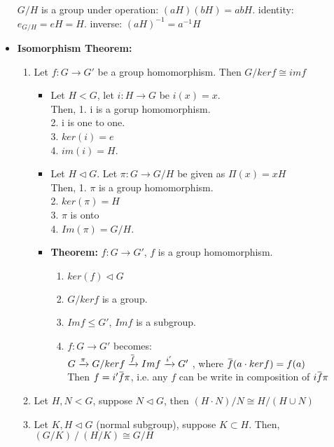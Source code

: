 \documentclass[12pt]{article}
\newcommand{\overbar}[1]{\mkern 1.5mu\overline{\mkern-1.5mu#1\mkern-1.5mu}\mkern 1.5mu}
\begin{document}
\begin{itemize}
    $G/H$ is a group under operation: $(aH)(bH) = abH$. identity: $e_{G/H} = eH = H$. inverse: $(aH)^{-1} = a^{-1}H$
    \item \textbf{Isomorphism Theorem:}
    \begin{enumerate}
        \item Let $f: G \rightarrow G'$ be a group homomorphism. Then $G/kerf \cong imf$
        \begin{itemize}
            \item Let $H < G$, let $i: H \rightarrow G$ be $i(x) = x$.\\
            Then, 1. i is a gorup homomorphism.\\
            2. i is one to one.\\
            3. $ker(i) = e$\\
            4. $im(i) = H$.
            \item Let $H \triangleleft G$. Let $\pi: G \rightarrow G/H$ be given as $\Pi(x) = xH$\\
            Then, 1. $\pi$ is a group homomorphism.\\
            2. $ker(\pi) = H$\\
            3. $\pi$ is onto \\
            4. $Im(\pi) = G/H$.
            \item \textbf{Theorem:} $f: G \rightarrow G'$, $f$ is a group homomorphism.
            \begin{enumerate}
                \item $ker(f) \triangleleft G$
                \item $G/kerf$ is a group.
                \item $Imf \le G'$, $Imf$ is a subgroup.
                \item $f: G \rightarrow G'$ becomes:\\
                $G \xrightarrow{\pi} G/kerf  \xrightarrow{\overbar{f}} Imf \xrightarrow{i'} G'$ , where $\overbar{f}(a\cdot kerf) = f(a)$\\
                Then $f = i'\overbar{f}\pi$, i.e. any $f$ can be write in composition of $i\overbar{f}\pi$
            \end{enumerate}
        \end{itemize}
        \item Let $H, N < G$, suppose $N \triangleleft G$, then $(H\cdot N) / N \cong H / (H \cup N)$
        \item Let $K, H \triangleleft G$ (normal subgroup), suppose $K \subset H$. Then, $(G/K)\ / \ (H/K) \cong G / H$
    \end{enumerate}
    \end{itemize}
\end{document}
